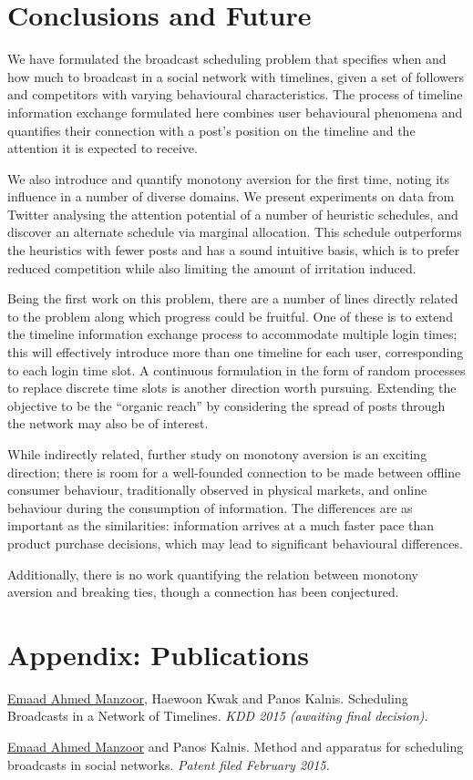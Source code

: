 \documentclass[onesided,letterpaper]{tufte-book}
\begin{document}
\chapter{Conclusions and Future}

We have formulated the broadcast scheduling problem that specifies when and how much to broadcast in a social network with timelines, given a set of followers and competitors with varying behavioural characteristics. The process of timeline information exchange formulated here combines user behavioural phenomena and quantifies their connection with a post's position on the timeline and the attention it is expected to receive.

We also introduce and quantify monotony aversion for the first time, noting its influence in a number of diverse domains. We present experiments on data from Twitter analysing the attention potential of a number of heuristic schedules, and discover an alternate schedule via marginal allocation. This schedule outperforms the heuristics with fewer posts and has a sound intuitive basis, which is to prefer reduced competition while also limiting the amount of irritation induced.

Being the first work on this problem, there are a number of lines directly related to the problem along which progress could be fruitful. One of these is to extend the timeline information exchange process to accommodate multiple login times; this will effectively introduce more than one timeline for each user, corresponding to each login time slot. A continuous formulation in the form of random processes to replace discrete time slots is another direction worth pursuing. Extending the objective to be the ``organic reach'' by considering the spread of posts through the network may also be of interest.

While indirectly related, further study on monotony aversion is an exciting direction; there is room for a well-founded connection to be made between offline consumer behaviour, traditionally observed in physical markets, and online behaviour during the consumption of information. The differences are as important as the similarities: information arrives at a much faster pace than product purchase decisions, which may lead to significant behavioural differences.

Additionally, there is no work quantifying the relation between monotony aversion and breaking ties, though a connection has been conjectured\cite{kwak2011fragile}.

\backmatter

\chapter{Appendix: Publications}

\underline{Emaad Ahmed Manzoor}, Haewoon Kwak and Panos Kalnis. Scheduling Broadcasts in a Network of Timelines. \textit{KDD 2015 (awaiting final decision)}.

\underline{Emaad Ahmed Manzoor} and Panos Kalnis. Method and apparatus for scheduling broadcasts in social networks. \textit{Patent filed February 2015.}




\printindex
\end{document}
